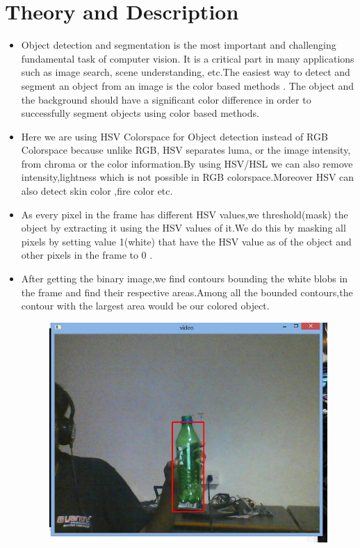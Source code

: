 \documentclass[11pt,a4paper]{article}
\begin{document}
	\section{Theory and Description}
	\begin{itemize}
		\item Object detection and segmentation is the most important and challenging fundamental task of computer vision.  It is a critical part in many applications such as image search, scene understanding, etc.The easiest way to detect and segment an object from an image is the color based methods . The object and the background should have a significant color difference in order to successfully  segment objects using color based methods.
		\item Here we are using HSV Colorspace for Object detection instead of RGB Colorspace because unlike RGB, HSV separates luma, or the image intensity, from chroma or the color information.By using HSV/HSL we can also remove intensity,lightness which is not possible in RGB colorspace.Moreover HSV can also detect skin color ,fire color etc. 
		\item  As every pixel in the frame has different HSV values,we threshold(mask) the object by extracting it using the HSV values of it.We do this by masking all pixels by setting value 1(white) that have the HSV value as of the object and other pixels in the frame to 0 .
		\item After getting the binary image,we find contours bounding the white blobs in the frame and find their respective areas.Among all the bounded contours,the contour with the largest area would be our colored object.
		\begin{figure}[h!]
		\includegraphics[scale=0.4]{Capture1.jpg}	

\end{figure}
\end{itemize}
\end{document}
